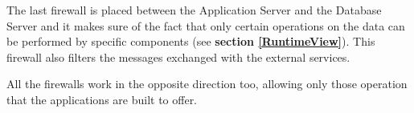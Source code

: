 The last firewall is placed between the Application Server and the Database Server and it makes sure of the fact that only certain operations on the data can be performed by specific components (see \textbf{section \ref{RuntimeView}}).
This firewall also filters the messages exchanged with the external services.

All the firewalls work in the opposite direction too, allowing only those operation that the applications are built to offer.


